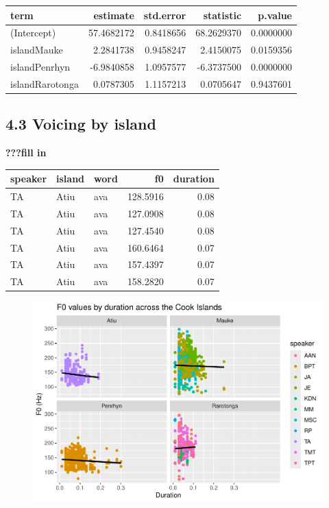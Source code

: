 \documentclass[
  ,man,floatsintext]{apa6}
\begin{document}
\begin{tabular}{l|r|r|r|r}
\hline
term & estimate & std.error & statistic & p.value\\
\hline
(Intercept) & 57.4682172 & 0.8418656 & 68.2629370 & 0.0000000\\
\hline
islandMauke & 2.2841738 & 0.9458247 & 2.4150075 & 0.0159356\\
\hline
islandPenrhyn & -6.9840858 & 1.0957577 & -6.3737500 & 0.0000000\\
\hline
islandRarotonga & 0.0787305 & 1.1157213 & 0.0705647 & 0.9437601\\
\hline
\end{tabular}

\subsection{4.3 Voicing by island}\label{voicing-by-island}

\textbf{???fill in}

\begin{tabular}{l|l|l|r|r}
\hline
speaker & island & word & f0 & duration\\
\hline
TA & Atiu & ava & 128.5916 & 0.08\\
\hline
TA & Atiu & ava & 127.0908 & 0.08\\
\hline
TA & Atiu & ava & 127.4540 & 0.08\\
\hline
TA & Atiu & ava & 160.6464 & 0.07\\
\hline
TA & Atiu & ava & 157.4397 & 0.07\\
\hline
TA & Atiu & ava & 158.2820 & 0.07\\
\hline
\end{tabular}

\begin{figure}
\includegraphics[width=0.75\linewidth]{D2_CIM_files/figure-latex/plot-f0-1} \caption{ }\label{fig:plot-f0}
\end{figure}
\end{document}
